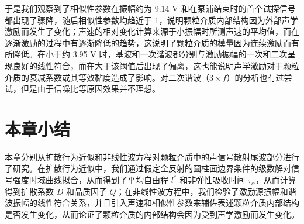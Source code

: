于是我们观察到了相似性参数在振幅约为 9.14 \unit{\volt} 和在泵浦结束时的首个试探信号都出现了骤降，随后相似性参数均趋近于 1，说明颗粒介质内部结构因为外部声学激励而发生了变化；声速的相对变化计算来源于小振幅时所测声速的平均值，而在逐渐激励的过程中有逐渐降低的趋势，这说明了颗粒介质的模量因为连续激励而有所降低。在小于约 3.95 \unit{\volt} 时，基波和一次谐波都分别与激励振幅的一次和二次呈现良好的线性符合，而在大于该阈值后出现了偏离，这也能说明声学激励对于颗粒介质的衰减系数或其等效黏度造成了影响。对二次谐波（$3\times f$）的分析也有过尝试，但是由于信噪比等原因效果并不理想。

\section{本章小结}

本章分别从扩散行为近似和非线性波方程对颗粒介质中的声信号散射尾波部分进行了研究。在扩散行为近似中，我们通过假定全反射的圆柱面边界条件的级数解对信号强度时域曲线拟合，从而得到了平均自由程 $l^{*}$ 和非弹性吸收时间 $\tau_{\alpha}$，从而计算得到扩散系数 $D$ 和品质因子 $Q$；在非线性波方程中，我们检验了激励源振幅和谐波振幅的线性符合关系，并且引入声速和相似性参数来辅佐表述颗粒介质内部结构是否发生变化，从而论证了颗粒介质的内部结构会因为受到声学激励而发生变化。
